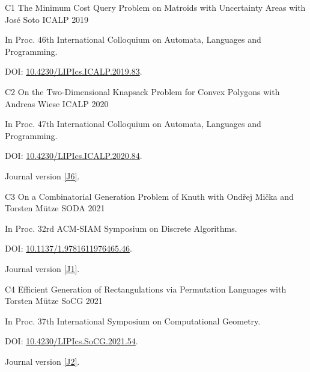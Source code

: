 \begin{cvpublications}
  \cvpublication
  {C1}
  {The Minimum Cost Query Problem on Matroids with Uncertainty Areas} %
  {with José Soto} %
  {ICALP} %
  {2019}
  {%
  \begin{cvitems} %
    \item In Proc. 46th International Colloquium on Automata, Languages and Programming.  
    \item[] DOI: \href{https://doi.org/10.4230/LIPICS.ICALP.2019.83}{10.4230/LIPIcs.ICALP.2019.83}.
  \end{cvitems}%
  }
  
  \cvpublication
  {C2}
  {On the Two-Dimensional Knapsack Problem for Convex Polygons} %
  {with Andreas Wiese} %
  {ICALP} %
  {2020}
  {
  \begin{cvitems} %
    \item   In Proc. 47th International Colloquium on Automata, Languages and Programming.
    \item[] DOI: \href{https://doi.org/10.4230/LIPIcs.ICALP.2020.84}{10.4230/LIPIcs.ICALP.2020.84}.
    \item   Journal version \hyperlink{paperJ6}{[J6]}.
  \end{cvitems}
  }
  
  \cvpublication
  {C3}
  {On a Combinatorial Generation Problem of Knuth} %
  {with Ondřej Mička and Torsten Mütze} %
  {SODA} %
  {2021}
  {
  \begin{cvitems} %
    \item   In Proc. 32rd ACM-SIAM Symposium on Discrete Algorithms.
    \item[] DOI: \href{https://doi.org/10.1137/1.9781611976465.46}{10.1137/1.9781611976465.46}.
    \item   Journal version \hyperlink{paperJ1}{[J1]}.
  \end{cvitems}
  }
  
  \cvpublication
  {C4}
  {Efficient Generation of Rectangulations via Permutation Languages} %
  {with Torsten Mütze} %
  {SoCG} %
  {2021}
  {
  \begin{cvitems} %
    \item   In Proc. 37th International Symposium on Computational Geometry.
    \item[] DOI: \href{https://doi.org/10.4230/LIPIcs.SoCG.2021.54}{10.4230/LIPIcs.SoCG.2021.54}.
    \item   Journal version \hyperlink{paperJ2}{[J2]}.
  \end{cvitems}
  }
  

\end{cvpublications}
